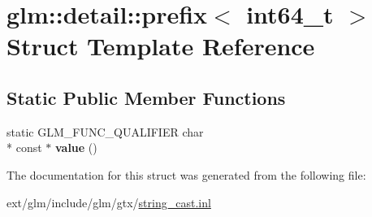 \hypertarget{structglm_1_1detail_1_1prefix_3_01int64__t_01_4}{\section{glm\-:\-:detail\-:\-:prefix$<$ int64\-\_\-t $>$ Struct Template Reference}
\label{structglm_1_1detail_1_1prefix_3_01int64__t_01_4}
}
\subsection*{Static Public Member Functions}
\begin{DoxyCompactItemize}
\item 
\hypertarget{structglm_1_1detail_1_1prefix_3_01int64__t_01_4_a845043fc18700790972ca73ebc80ac4d}{static G\-L\-M\-\_\-\-F\-U\-N\-C\-\_\-\-Q\-U\-A\-L\-I\-F\-I\-E\-R char \\*
const $\ast$ {\bfseries value} ()}\label{structglm_1_1detail_1_1prefix_3_01int64__t_01_4_a845043fc18700790972ca73ebc80ac4d}

\end{DoxyCompactItemize}


The documentation for this struct was generated from the following file\-:\begin{DoxyCompactItemize}
\item 
ext/glm/include/glm/gtx/\hyperlink{string__cast_8inl}{string\-\_\-cast.\-inl}\end{DoxyCompactItemize}
